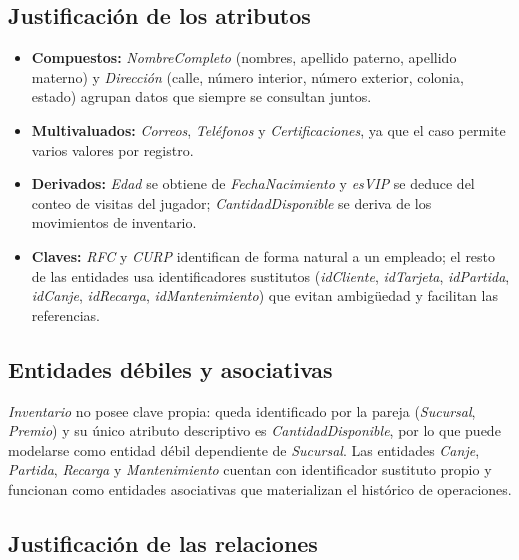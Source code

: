 \documentclass[11pt,letterpaper,spanish]{article}
\begin{document}
\subsection*{Justificación de los atributos}

\begin{itemize}
	\item \textbf{Compuestos:} \emph{NombreCompleto} (nombres, apellido paterno, apellido
	      materno) y \emph{Dirección} (calle, número interior, número exterior, colonia,
	      estado) agrupan datos que siempre se consultan juntos.
	\item \textbf{Multivaluados:} \emph{Correos}, \emph{Teléfonos} y
	      \emph{Certificaciones}, ya que el caso permite varios valores por registro.
	\item \textbf{Derivados:} \emph{Edad} se obtiene de \emph{FechaNacimiento} y
	      \emph{esVIP} se deduce del conteo de visitas del jugador; \emph{CantidadDisponible}
	      se deriva de los movimientos de inventario.
	\item \textbf{Claves:} \emph{RFC} y \emph{CURP} identifican de forma natural a un
	      empleado; el resto de las entidades usa identificadores sustitutos
	      (\emph{idCliente}, \emph{idTarjeta}, \emph{idPartida}, \emph{idCanje},
	      \emph{idRecarga}, \emph{idMantenimiento}) que evitan ambigüedad y facilitan las
	      referencias.
\end{itemize}

\subsection*{Entidades débiles y asociativas}

\emph{Inventario} no posee clave propia: queda identificado por la pareja
(\emph{Sucursal}, \emph{Premio}) y su único atributo descriptivo es
\emph{CantidadDisponible}, por lo que puede modelarse como entidad débil dependiente de
\emph{Sucursal}. Las entidades \emph{Canje}, \emph{Partida}, \emph{Recarga} y
\emph{Mantenimiento} cuentan con identificador sustituto propio y funcionan como entidades
asociativas que materializan el histórico de operaciones.

\subsection*{Justificación de las relaciones }
\end{document}
